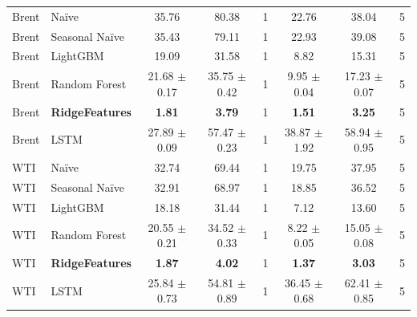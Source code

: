 \documentclass[conference]{IEEEtran}
\begin{document}
\begin{table}[!t]
\begin{tabular}{ll|ccc|ccc}
		\midrule
		Brent       & Na\"{i}ve              & 35.76                          & 80.38                              & 1        & 22.76               & 38.04            & 5        \\
		Brent       & Seasonal Na\"{i}ve     & 35.43                          & 79.11                              & 1        & 22.93               & 39.08            & 5        \\
		Brent       & LightGBM               & 19.09                          & 31.58                              & 1        & 8.82                & 15.31            & 5        \\
		Brent       & Random Forest          & 21.68 $\pm$ 0.17               & 35.75 $\pm$ 0.42                   & 1        & 9.95 $\pm$ 0.04     & 17.23 $\pm$ 0.07 & 5        \\
		Brent       & \textbf{RidgeFeatures} & \textbf{1.81}                  & \textbf{3.79}                      & 1        & \textbf{1.51}       & \textbf{3.25}    & 5        \\
		Brent       & LSTM                   & 27.89 $\pm$ 0.09               & 57.47 $\pm$ 0.23                   & 1        & 38.87 $\pm$ 1.92    & 58.94 $\pm$ 0.95 & 5        \\
		\midrule
		WTI         & Na\"{i}ve              & 32.74                          & 69.44                              & 1        & 19.75               & 37.95            & 5        \\
		WTI         & Seasonal Na\"{i}ve     & 32.91                          & 68.97                              & 1        & 18.85               & 36.52            & 5        \\
		WTI         & LightGBM               & 18.18                          & 31.44                              & 1        & 7.12                & 13.60            & 5        \\
		WTI         & Random Forest          & 20.55 $\pm$ 0.21               & 34.52 $\pm$ 0.33                   & 1        & 8.22 $\pm$ 0.05     & 15.05 $\pm$ 0.08 & 5        \\
		WTI         & \textbf{RidgeFeatures} & \textbf{1.87}                  & \textbf{4.02}                      & 1        & \textbf{1.37}       & \textbf{3.03}    & 5        \\
		WTI         & LSTM                   & 25.84 $\pm$ 0.73               & 54.81 $\pm$ 0.89                   & 1        & 36.45 $\pm$ 0.68    & 62.41 $\pm$ 0.85 & 5        \\

\end{tabular}
\end{table}
\end{document}
